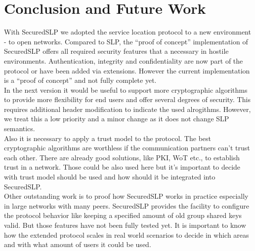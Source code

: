 \section{Conclusion and Future Work}
With SecuredSLP we adopted the service location protocol to a new environment -
to open networks. Compared to SLP, the ``proof of concept'' implementation of
SecuredSLP offers all required security features that a necessary in hostile
environments. Authentication, integrity and confidentiality are now part of the
protocol or have been added via extensions. However the current implementation is
a ``proof of concept'' and not fully complete yet.\\ In the next version it would
be useful to support more cryptographic algorithms to provide more flexibility
for end users and offer several degrees of security. This requires additional
header modification to indicate the used alrogithms. However, we treat this a low
priority and a minor change as it does not change SLP semantics.\\ Also it is
necessary to apply a trust model to the protocol. The best cryptographic
algorithms are worthless if the communication partners can't trust each other.
There are already good solutions, like PKI, WoT etc., to establish trust in a
network. Those could be also used here but it's important to decide with trust
model should be used and how should it be integrated into SecuredSLP.\\ Other
outstanding work is to proof how 
SecuredSLP works in practice especially in large networks with many
peers. SecuredSLP provides the facility to configure the protocol behavior
like keeping a specified amount of old group shared keys valid. But those
features have not been fully tested yet. It is important to know how the
extended protocol scales in real world scenarios to decide in which areas and
with what amount of users it could be used.
